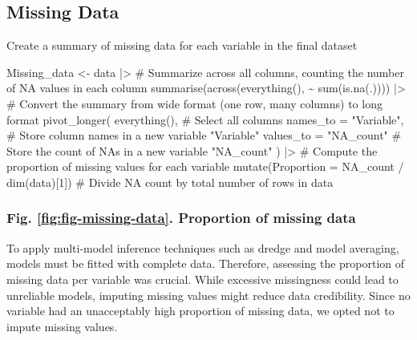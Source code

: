 \documentclass[
  bookmarksnumbered]{article}
\newenvironment{Shaded}{\begin{snugshade}}{\end{snugshade}}
\newcommand{\AttributeTok}[1]{\textcolor[rgb]{0.80,0.80,0.80}{#1}}
\newcommand{\CommentTok}[1]{\textcolor[rgb]{0.50,0.62,0.50}{#1}}
\newcommand{\DecValTok}[1]{\textcolor[rgb]{0.86,0.86,0.80}{#1}}
\newcommand{\FunctionTok}[1]{\textcolor[rgb]{0.94,0.94,0.56}{#1}}
\newcommand{\NormalTok}[1]{\textcolor[rgb]{0.80,0.80,0.80}{#1}}
\newcommand{\OtherTok}[1]{\textcolor[rgb]{0.94,0.94,0.56}{#1}}
\newcommand{\SpecialCharTok}[1]{\textcolor[rgb]{0.86,0.64,0.64}{#1}}
\newcommand{\StringTok}[1]{\textcolor[rgb]{0.80,0.58,0.58}{#1}}
\begin{document}
\subsection{Missing Data}\label{missing-data}

Create a summary of missing data for each variable in the final dataset

\begin{Shaded}
\begin{Highlighting}[]
\NormalTok{Missing\_data }\OtherTok{\textless{}{-}}\NormalTok{ data }\SpecialCharTok{|\textgreater{}}
  \CommentTok{\# Summarize across all columns, counting the number of NA values in each column}
  \FunctionTok{summarise}\NormalTok{(}\FunctionTok{across}\NormalTok{(}\FunctionTok{everything}\NormalTok{(), }\SpecialCharTok{\textasciitilde{}} \FunctionTok{sum}\NormalTok{(}\FunctionTok{is.na}\NormalTok{(.)))) }\SpecialCharTok{|\textgreater{}}
  \CommentTok{\# Convert the summary from wide format (one row, many columns) to long format}
  \FunctionTok{pivot\_longer}\NormalTok{(}
    \FunctionTok{everything}\NormalTok{(),               }\CommentTok{\# Select all columns}
    \AttributeTok{names\_to =} \StringTok{"Variable"}\NormalTok{,      }\CommentTok{\# Store column names in a new variable "Variable"}
    \AttributeTok{values\_to =} \StringTok{"NA\_count"}      \CommentTok{\# Store the count of NAs in a new variable "NA\_count"}
\NormalTok{  ) }\SpecialCharTok{|\textgreater{}} 
  \CommentTok{\# Compute the proportion of missing values for each variable}
  \FunctionTok{mutate}\NormalTok{(}\AttributeTok{Proportion =}\NormalTok{ NA\_count }\SpecialCharTok{/} \FunctionTok{dim}\NormalTok{(data)[}\DecValTok{1}\NormalTok{])  }\CommentTok{\# Divide NA count by total number of rows in \textquotesingle{}data\textquotesingle{}}
\end{Highlighting}
\end{Shaded}

\subsubsection{Fig. \ref{fig:fig-missing-data}. Proportion of missing data}\label{fig.-reffigfig-missing-data.-proportion-of-missing-data}

To apply multi-model inference techniques such as dredge and model averaging, models must be fitted with complete data. Therefore, assessing the proportion of missing data per variable was crucial. While excessive missingness could lead to unreliable models, imputing missing values might reduce data credibility. Since no variable had an unacceptably high proportion of missing data, we opted not to impute missing values.
\end{document}
